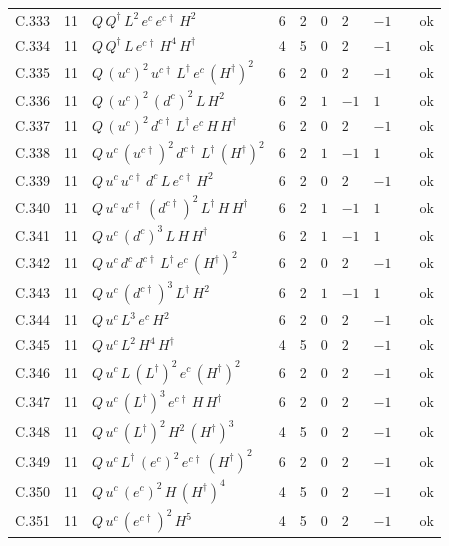 {\begin{longtable}{@{}ll>{\raggedright\arraybackslash}p{6.4cm}rrllllr@{}}
C.333 & 11 & $Q\,Q^\dagger\,L^{2}\,e^c\,e^{c\dagger}\,H^{2}$ & 6 & 2 & $0$ & $2$ & $-1$ &  & ok \\
C.334 & 11 & $Q\,Q^\dagger\,L\,e^{c\dagger}\,H^{4}\,H^\dagger$ & 4 & 5 & $0$ & $2$ & $-1$ &  & ok \\
C.335 & 11 & $Q\,(u^c)^{2}\,u^{c\dagger}\,L^\dagger\,e^c\,(H^\dagger)^{2}$ & 6 & 2 & $0$ & $2$ & $-1$ &  & ok \\
C.336 & 11 & $Q\,(u^c)^{2}\,(d^c)^{2}\,L\,H^{2}$ & 6 & 2 & $1$ & $-1$ & $1$ &  & ok \\
C.337 & 11 & $Q\,(u^c)^{2}\,d^{c\dagger}\,L^\dagger\,e^c\,H\,H^\dagger$ & 6 & 2 & $0$ & $2$ & $-1$ &  & ok \\
C.338 & 11 & $Q\,u^c\,(u^{c\dagger})^{2}\,d^{c\dagger}\,L^\dagger\,(H^\dagger)^{2}$ & 6 & 2 & $1$ & $-1$ & $1$ &  & ok \\
C.339 & 11 & $Q\,u^c\,u^{c\dagger}\,d^c\,L\,e^{c\dagger}\,H^{2}$ & 6 & 2 & $0$ & $2$ & $-1$ &  & ok \\
C.340 & 11 & $Q\,u^c\,u^{c\dagger}\,(d^{c\dagger})^{2}\,L^\dagger\,H\,H^\dagger$ & 6 & 2 & $1$ & $-1$ & $1$ &  & ok \\
C.341 & 11 & $Q\,u^c\,(d^c)^{3}\,L\,H\,H^\dagger$ & 6 & 2 & $1$ & $-1$ & $1$ &  & ok \\
C.342 & 11 & $Q\,u^c\,d^c\,d^{c\dagger}\,L^\dagger\,e^c\,(H^\dagger)^{2}$ & 6 & 2 & $0$ & $2$ & $-1$ &  & ok \\
C.343 & 11 & $Q\,u^c\,(d^{c\dagger})^{3}\,L^\dagger\,H^{2}$ & 6 & 2 & $1$ & $-1$ & $1$ &  & ok \\
C.344 & 11 & $Q\,u^c\,L^{3}\,e^c\,H^{2}$ & 6 & 2 & $0$ & $2$ & $-1$ &  & ok \\
C.345 & 11 & $Q\,u^c\,L^{2}\,H^{4}\,H^\dagger$ & 4 & 5 & $0$ & $2$ & $-1$ &  & ok \\
C.346 & 11 & $Q\,u^c\,L\,(L^\dagger)^{2}\,e^c\,(H^\dagger)^{2}$ & 6 & 2 & $0$ & $2$ & $-1$ &  & ok \\
C.347 & 11 & $Q\,u^c\,(L^\dagger)^{3}\,e^{c\dagger}\,H\,H^\dagger$ & 6 & 2 & $0$ & $2$ & $-1$ &  & ok \\
C.348 & 11 & $Q\,u^c\,(L^\dagger)^{2}\,H^{2}\,(H^\dagger)^{3}$ & 4 & 5 & $0$ & $2$ & $-1$ &  & ok \\
C.349 & 11 & $Q\,u^c\,L^\dagger\,(e^c)^{2}\,e^{c\dagger}\,(H^\dagger)^{2}$ & 6 & 2 & $0$ & $2$ & $-1$ &  & ok \\
C.350 & 11 & $Q\,u^c\,(e^c)^{2}\,H\,(H^\dagger)^{4}$ & 4 & 5 & $0$ & $2$ & $-1$ &  & ok \\
C.351 & 11 & $Q\,u^c\,(e^{c\dagger})^{2}\,H^{5}$ & 4 & 5 & $0$ & $2$ & $-1$ &  & ok \\

\end{longtable}}
